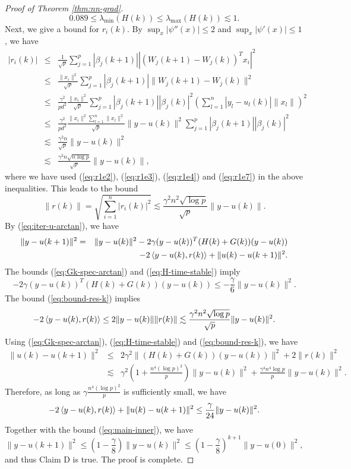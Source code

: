 \begin{proof}[Proof of Theorem \ref{thm:nn-grad}]
\begin{equation}
0.089 \leq \lambda_{\min}(H(k)) \leq \lambda_{\max}(H(k)) \lesssim 1. \label{eq:H-time-stable}
\end{equation}
Next, we give a bound for $r_i(k)$. By $\sup_x|\psi''(x)|\leq 2$ and $\sup_x|\psi'(x)|\leq 1$, we have
\begin{eqnarray*}
|r_i(k)| &\leq& \frac{1}{\sqrt{p}}\sum_{j=1}^p|\beta_j(k+1)||(W_j(k+1)-W_j(k))^Tx_i|^2 \\
&\leq& \frac{\|x_i\|^2}{\sqrt{p}}\sum_{j=1}^p|\beta_j(k+1)|\|W_j(k+1)-W_j(k)\|^2 \\
&\leq& \frac{\gamma^2}{pd^2}\frac{\|x_i\|^2}{\sqrt{p}}\sum_{j=1}^p|\beta_j(k+1)||\beta_j(k)|^2\left(\sum_{l=1}^n|y_l-u_l(k)|\|x_l\|\right)^2 \\
&\leq& \frac{\gamma^2}{pd^2}\frac{\|x_i\|^2\sum_{l=1}^n\|x_l\|^2}{\sqrt{p}}\|y-u(k)\|^2\sum_{j=1}^p|\beta_j(k+1)||\beta_j(k)|^2 \\
&\lesssim& \frac{\gamma^2n}{\sqrt{p}}\|y-u(k)\|^2 \\
&\lesssim& \frac{\gamma^2n\sqrt{n\log p}}{\sqrt{p}}\|y-u(k)\|,
\end{eqnarray*}
where we have used (\ref{eq:r1e2}), (\ref{eq:r1e3}), (\ref{eq:r1e4}) and (\ref{eq:r1e7}) in the above inequalities.
This leads to the bound
\begin{equation}
\|r(k)\|=\sqrt{\sum_{i=1}^n|r_i(k)|^2}\lesssim \frac{\gamma^2n^2\sqrt{\log p}}{\sqrt{p}}\|y-u(k)\|.\label{eq:bound-res-k}
\end{equation}
By (\ref{eq:iter-u-arctan}), we have
\begin{eqnarray*}
\|y-u(k+1)\|^2
&=& \|y-u(k)\|^2 - 2\gamma(y-u(k))^T(H(k)+G(k))(y-u(k)) \\
&& - 2\iprod{y-u(k)}{r(k)} + \|u(k)-u(k+1)\|^2.
\end{eqnarray*}
The bounds (\ref{eq:Gk-spec-arctan}) and (\ref{eq:H-time-stable}) imply
\begin{equation}
- 2\gamma(y-u(k))^T(H(k)+G(k))(y-u(k)) \leq -\frac{\gamma}{6}\|y-u(k)\|^2. \label{eq:main-inner}
\end{equation}
The bound (\ref{eq:bound-res-k}) implies
$$- 2\left \langle y-u(k), r(k) \right\rangle\leq 2\|y-u(k)\|\|r(k)\|\lesssim \frac{\gamma^2n^2\sqrt{\log p}}{\sqrt{p}}\|y-u(k)\|^2.$$
Using (\ref{eq:Gk-spec-arctan}), (\ref{eq:H-time-stable}) and (\ref{eq:bound-res-k}), we have
\begin{eqnarray*}
\|u(k)-u(k+1)\|^2 &\leq& 2\gamma^2\|(H(k)+G(k))(y-u(k))\|^2 + 2\|r(k)\|^2 \\
&\lesssim& \gamma^2\left(1+\frac{n^4(\log p)^2}{p}\right)\|y-u(k)\|^2 + \frac{\gamma^4n^4\log p}{p}\|y-u(k)\|^2 .
\end{eqnarray*}
Therefore, as long as $\gamma\frac{n^4(\log p)^2}{p}$ is sufficiently small, we have
$$- 2\left \langle y-u(k), r(k) \right\rangle + \|u(k)-u(k+1)\|^2 \leq \frac{\gamma}{24}\|y-u(k)\|^2.$$
Together with the bound (\ref{eq:main-inner}), we have
$$\|y-u(k+1)\|^2 \leq \left(1-\frac{\gamma}{8}\right)\|y-u(k)\|^2\leq \left(1-\frac{\gamma}{8}\right)^{k+1}\|y-u(0)\|^2,$$
and thus Claim D is true. The proof is complete.
\end{proof}






